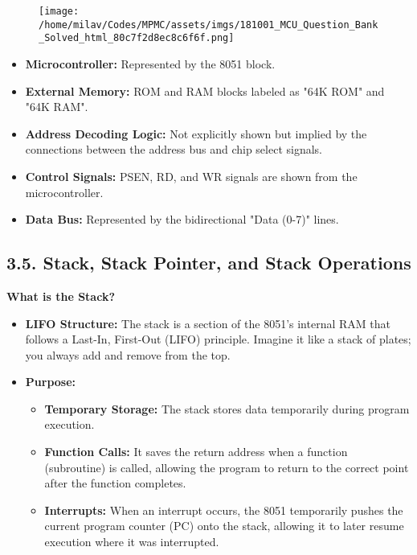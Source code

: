 \documentclass[
]{article}
\begin{document}
\begin{figure}
\centering
\texttt{[image: /home/milav/Codes/MPMC/assets/imgs/181001\_MCU\_Question\_Bank\_Solved\_html\_80c7f2d8ec8c6f6f.png]}
\caption{}
\end{figure}

\begin{itemize}
\item
  \textbf{Microcontroller:} Represented by the 8051 block.
\item
  \textbf{External Memory:} ROM and RAM blocks labeled as "64K ROM" and
  "64K RAM".
\item
  \textbf{Address Decoding Logic:} Not explicitly shown but implied by
  the connections between the address bus and chip select signals.
\item
  \textbf{Control Signals:} PSEN, RD, and WR signals are shown from the
  microcontroller.
\item
  \textbf{Data Bus:} Represented by the bidirectional "Data (0-7)"
  lines.
\end{itemize}

\hypertarget{35-stack-stack-pointer-and-stack-operations}{%
\subsection{3.5. Stack, Stack Pointer, and Stack
Operations}\label{35-stack-stack-pointer-and-stack-operations}}

\textbf{What is the Stack?}

\begin{itemize}
\item
  \textbf{LIFO Structure:} The stack is a section of the 8051's internal
  RAM that follows a Last-In, First-Out (LIFO) principle. Imagine it
  like a stack of plates; you always add and remove from the top.
\item
  \textbf{Purpose:}

  \begin{itemize}
  \item
    \textbf{Temporary Storage:} The stack stores data temporarily during
    program execution.
  \item
    \textbf{Function Calls:} It saves the return address when a function
    (subroutine) is called, allowing the program to return to the
    correct point after the function completes.
  \item
    \textbf{Interrupts:} When an interrupt occurs, the 8051 temporarily
    pushes the current program counter (PC) onto the stack, allowing it
    to later resume execution where it was interrupted.
  \end{itemize}
\end{itemize}
\end{document}
